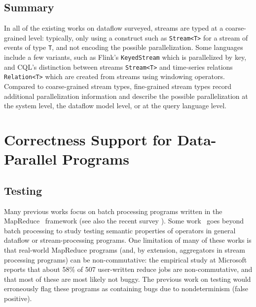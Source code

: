 \subsection{Summary}

In all of the existing works on dataflow surveyed, streams are typed at a coarse-grained level: typically, only using a construct such as \texttt{Stream<T>} for a stream of events of type \texttt{T}, and not encoding the possible parallelization.
Some languages include a few variants, such as Flink's \texttt{KeyedStream} which is parallelized by key, and CQL's distinction between streams \texttt{Stream<T>} and time-series relations \texttt{Relation<T>} which are created from streams using windowing operators.
Compared to coarse-grained stream types, fine-grained stream types
record additional parallelization information and describe the possible parallelization at the system level, the dataflow model level, or at the query language level.

\section{Correctness Support for Data-Parallel Programs}

\subsection{Testing}

Many previous works focus on batch processing programs written in the MapReduce~\cite{dean2008mapreduce} framework \cite{csallner2011new,xu2013semantic,marynowski2012testing,chen2016commutativity} (see also the recent survey \cite{moran2019testing}).
Some work~\cite{xu2013testing} goes beyond batch processing to study testing semantic properties of operators in general dataflow or stream-processing programs.
One limitation of many of these works \cite{csallner2011new,xu2013semantic,xu2013testing,chen2016commutativity} is that real-world MapReduce programs (and, by extension, aggregators in stream processing programs) can be non-commutative: the empirical study at Microsoft~\cite{xiao2014nondeterminism} reports that about 58\% of 507 user-written reduce jobs are non-commutative, and that most of these are most likely not buggy.
The previous work on testing would erroneously flag these programs as containing bugs due to nondeterminism (false positive).

